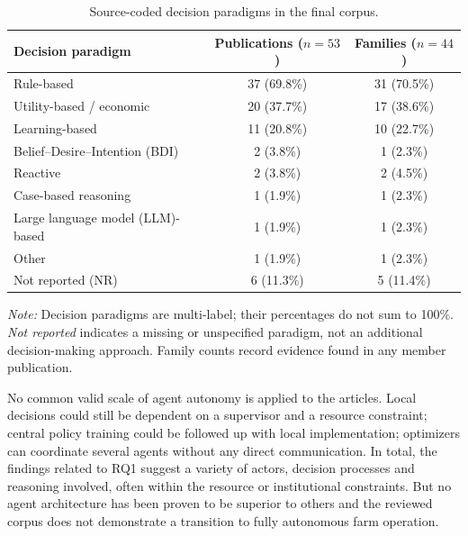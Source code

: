 \documentclass[11pt,a4paper]{article}
\begin{document}
\begin{table}[H]
\centering
\small

\caption{Source-coded decision paradigms in the
final corpus.}

\label{tab:rq1_paradigms}

\begin{tabularx}{\textwidth}{@{}Xcc@{}}
\toprule

\textbf{Decision paradigm} &
\textbf{Publications ($n=53$)} &
\textbf{Families ($n=44$)} \\

\midrule

Rule-based &
37 (69.8\%) & 31 (70.5\%) \\

Utility-based / economic &
20 (37.7\%) & 17 (38.6\%) \\

Learning-based &
11 (20.8\%) & 10 (22.7\%) \\

Belief--Desire--Intention (BDI) &
2 (3.8\%) & 1 (2.3\%) \\

Reactive &
2 (3.8\%) & 2 (4.5\%) \\

Case-based reasoning &
1 (1.9\%) & 1 (2.3\%) \\

Large language model (LLM)-based &
1 (1.9\%) & 1 (2.3\%) \\

Other &
1 (1.9\%) & 1 (2.3\%) \\

Not reported (NR) &
6 (11.3\%) & 5 (11.4\%) \\

\bottomrule
\end{tabularx}

\par\smallskip

\begin{minipage}{\textwidth}
\footnotesize
\emph{Note:} Decision paradigms are multi-label;
their percentages do not sum to 100\%.
\emph{Not reported} indicates a missing or unspecified
paradigm, not an additional decision-making approach.
Family counts record evidence found in any member publication.
\end{minipage}

\end{table}

No common valid scale of agent autonomy is applied to the articles.
Local decisions could still be dependent on a supervisor and a resource
constraint; central policy training could be followed up with local
implementation; optimizers can coordinate several agents without any direct
communication. In total, the findings related to
RQ1 suggest a variety of actors, decision processes and reasoning involved,
often within the resource or institutional constraints. But no agent
architecture has been proven to be superior to others and the reviewed corpus does not demonstrate a transition to fully autonomous farm operation.
\end{document}
